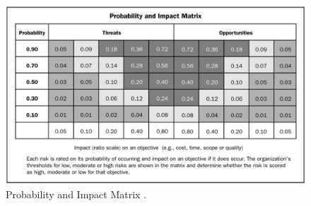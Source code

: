 \begin{figure}[H]
	\centering
	\includegraphics[width=\linewidth]{./images/risks2}
	\caption[Probability and Impact Matrix]{Probability and Impact Matrix \cite{ProjectManagementInstitute2004}.}
	\label{fig:risks2}
\end{figure}
